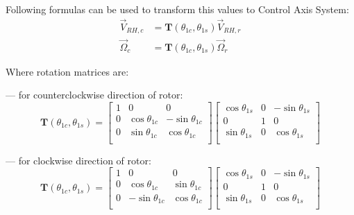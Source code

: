 Following formulas can be used to transform this values to Control Axis System:
\begin{align}
  {\vec V}_{RH,c} 
  &=
  {\boldsymbol T} \left( \theta_{1c}, \theta_{1s} \right)
  {\vec V}_{RH,r} \\
  {\vec \Omega}_c
  &=
  {\boldsymbol T} \left( \theta_{1c}, \theta_{1s} \right)
  {\vec \Omega}_r
\end{align}

Where rotation matrices are:

--- for counterclockwise direction of rotor:
\begin{equation}
  {\boldsymbol T} \left( \theta_{1c}, \theta_{1s} \right)
  =
  \left[
    \begin{matrix}
      1 &                0 &                 0 \\
      0 & \cos \theta_{1c} & -\sin \theta_{1c} \\
      0 & \sin \theta_{1c} &  \cos \theta_{1c} \\
    \end{matrix}
  \right]
  \left[
    \begin{matrix}
      \cos \theta_{1s} & 0 & -\sin \theta_{1s} \\
                    0 & 1 &                 0 \\
      \sin \theta_{1s} & 0 &  \cos \theta_{1s} \\
    \end{matrix}
  \right]
\end{equation}

--- for clockwise direction of rotor:
\begin{equation}
  {\boldsymbol T} \left( \theta_{1c}, \theta_{1s} \right)
  =
  \left[
    \begin{matrix}
      1 &                 0 &                0 \\
      0 &  \cos \theta_{1c} & \sin \theta_{1c} \\
      0 & -\sin \theta_{1c} & \cos \theta_{1c} \\
    \end{matrix}
  \right]
  \left[
    \begin{matrix}
      \cos \theta_{1s} & 0 & -\sin \theta_{1s} \\
                    0 & 1 &                 0 \\
      \sin \theta_{1s} & 0 &  \cos \theta_{1s} \\
    \end{matrix}
  \right]
\end{equation}

